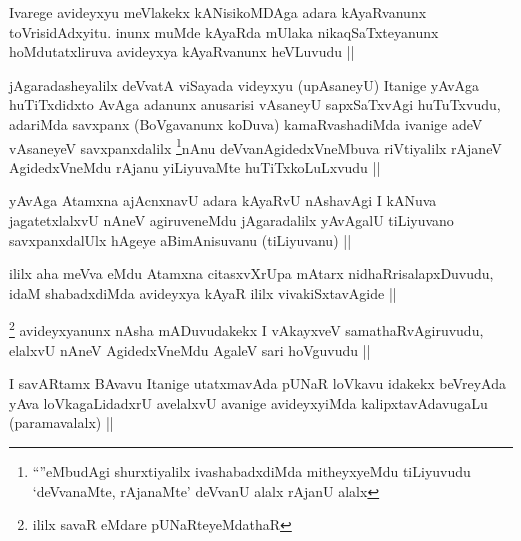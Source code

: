 
\begin{artha}
Ivarege avideyxyu meVlakekx kANisikoMDAga adara kAyaRvanunx toVrisidAdxyitu. inunx muMde kAyaRda mUlaka nikaqSaTxteyanunx hoMdutatxliruva avideyxya kAyaRvanunx heVLuvudu ||
\end{artha}


\begin{artha}
jAgaradasheyalilx deVvatA viSayada videyxyu (upAsaneyU) Itanige yAvAga huTiTxdidxto AvAga adanunx anusarisi vAsaneyU sapxSaTxvAgi huTuTxvudu, adariMda savxpanx (BoVgavanunx koDuva) kamaRvashadiMda ivanige adeV vAsaneyeV savxpanxdalilx \footnote{``\stext''eMbudAgi shurxtiyalilx ivashabadxdiMda mitheyxyeMdu tiLiyuvudu `deVvanaMte, rAjanaMte' deVvanU alalx rAjanU alalx}nAnu deVvanAgidedxVneMbuva riVtiyalilx rAjaneV AgidedxVneMdu rAjanu yiLiyuvaMte huTiTxkoLuLxvudu ||
\end{artha}


\begin{artha}
yAvAga Atamxna ajAcnxnavU adara kAyaRvU nAshavAgi I kANuva jagatetxlalxvU nAneV agiruveneMdu jAgaradalilx yAvAgalU tiLiyuvano savxpanxdalUlx hAgeye aBimAnisuvanu (tiLiyuvanu) ||
\end{artha}


\begin{artha}
ililx aha meVva eMdu Atamxna citasxvXrUpa mAtarx nidhaRrisalapxDuvudu, idaM shabadxdiMda avideyxya kAyaR ililx vivakiSxtavAgide ||
\end{artha}


\begin{artha}
\footnote{ililx savaR eMdare pUNaRteyeMdathaR}
avideyxyanunx nAsha mADuvudakekx I vAkayxveV samathaRvAgiruvudu, elalxvU nAneV AgidedxVneMdu AgaleV sari hoVguvudu ||
\end{artha}


\begin{artha}
I savARtamx BAvavu Itanige utatxmavAda pUNaR loVkavu idakekx beVreyAda yAva loVkagaLidadxrU avelalxvU avanige avideyxyiMda kalipxtavAdavugaLu (paramavalalx) ||
\end{artha}

